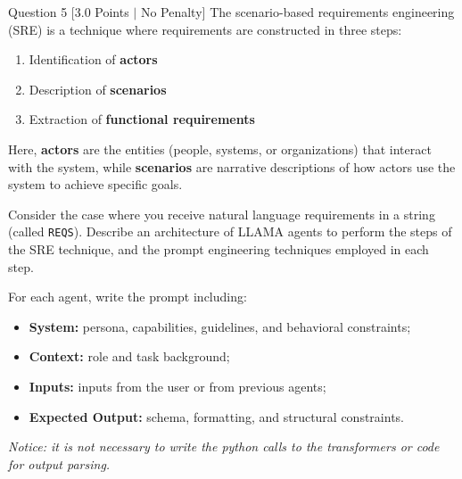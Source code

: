 \documentclass[11pt,a4paper]{article}
\begin{document}
\newpage
\begin{questionbox}{Question 5 \hfill [3.0 Points $\vert$ No Penalty]}
The scenario-based requirements engineering (SRE) is a technique where requirements are constructed in three steps:
\begin{enumerate}[label=\arabic*.]
    \item Identification of \textbf{actors}
    \item Description of \textbf{scenarios}
    \item Extraction of \textbf{functional requirements}
\end{enumerate}
Here, \textbf{actors} are the entities (people, systems, or organizations) that interact with the system, while \textbf{scenarios} are narrative descriptions of how actors use the system to achieve specific goals.

Consider the case where you receive natural language requirements in a string (called \texttt{REQS}). Describe an architecture of LLAMA agents to perform the steps of the SRE technique, and the prompt engineering techniques employed in each step.

For each agent, write the prompt including:
\begin{itemize}[noitemsep]
    \item \textbf{System:} persona, capabilities, guidelines, and behavioral constraints;
    \item \textbf{Context:} role and task background;
    \item \textbf{Inputs:} inputs from the user or from previous agents;
    \item \textbf{Expected Output:} schema, formatting, and structural constraints.
\end{itemize}

\textit{Notice: it is not necessary to write the python calls to the transformers or code for output parsing.}
\end{questionbox}

\bigskip
\end{document}
